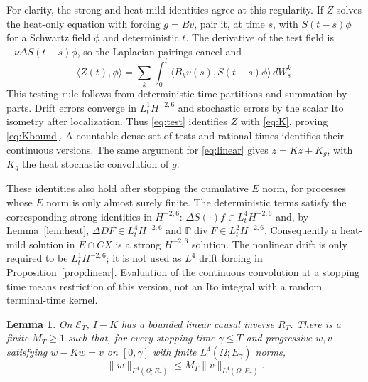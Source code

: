 \documentclass[11pt]{article}
\newcommand{\Pp}{\mathbb P}
\newtheorem{lemma}[theorem]{Lemma}
\numberwithin{equation}{section}
\begin{document}
For clarity, the strong and heat-mild identities agree at this regularity.
If $Z$ solves the heat-only equation with forcing $g=Bv$, pair it, at time
$s$, with $S(t-s)\phi$ for a Schwartz field $\phi$ and deterministic $t$.
The derivative of the test field is $-\nu\Delta S(t-s)\phi$, so the
Laplacian pairings cancel and
\begin{equation}\label{eq:test}
 \langle Z(t),\phi\rangle
 =\sum_k\int_0^t\langle B_kv(s),S(t-s)\phi\rangle\,dW_s^k.
\end{equation}
This testing rule follows from deterministic time partitions and summation
by parts. Drift errors converge in $L^1_tH^{-2,6}$ and stochastic errors by
the scalar Ito isometry after localization. Thus \eqref{eq:test} identifies
$Z$ with \eqref{eq:K}, proving \eqref{eq:Kbound}. A countable dense set of
tests and rational times identifies their continuous versions. The same
argument for \eqref{eq:linear} gives $z=Kz+K_g$, with $K_g$ the heat
stochastic convolution of $g$.

These identities also hold after stopping the cumulative $E$ norm, for
processes whose $E$ norm is only almost surely finite.
The deterministic terms satisfy the corresponding strong identities in
$H^{-2,6}$: $\Delta S(\cdot)f\in L^4_tH^{-2,6}$ and, by
Lemma~\ref{lem:heat}, $\Delta DF\in L^4_tH^{-2,6}$ and
$\Pp\operatorname{div}F\in L^2_tH^{-2,6}$.
Consequently a heat-mild solution in $E\cap C X$ is a strong
$H^{-2,6}$ solution. The nonlinear drift is only required to be
$L^1_tH^{-2,6}$; it is not used as $L^4$ drift forcing in
Proposition~\ref{prop:linear}. Evaluation of the continuous convolution at
a stopping time means restriction of this version, not an Ito integral
with a random terminal-time kernel.

\begin{lemma}\label{lem:inverse}
On $\mathcal E_T$, $I-K$ has a bounded linear causal inverse $R_T$.
There is a finite $M_T\geq1$ such that, for every stopping time
$\gamma\leq T$ and progressive $w,v$ satisfying $w-Kw=v$ on $[0,\gamma]$
with finite $L^4(\Omega;E_\gamma)$ norms,
\begin{equation}\label{eq:stoppedinverse}
 \|w\|_{L^4(\Omega;E_\gamma)}
 \leq M_T\|v\|_{L^4(\Omega;E_\gamma)}.
\end{equation}
\end{lemma}
\end{document}
